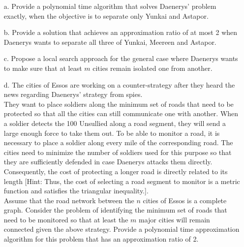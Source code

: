\documentclass{article}
\begin{document}
\begin{itemize}
\item[a.] Provide a polynomial time algorithm that solves Daenerys'
  problem exactly, when the objective is to separate only Yunkai and
  Astapor.

\item[b.] Provide a solution that achieves an approximation ratio of
  at most 2 when Daenerys wants to separate all three of Yunkai,
  Meereen and Astapor.
  
\item[c.] Propose a local search approach for the general case where
  Daenerys wants to make sure that at least $m$ cities remain isolated
  one from another.

\item[d.] The cities of Essos are working on a counter-strategy after
  they heard the news regarding Daenerys' strategy from spies.\\

 \noindent They want to place soldiers along the minimum set of roads
 that need to be protected so that all the cities can still
 communicate one with another. When a soldier detects the 100
 Unsullied along a road segment, they will send a large enough force
 to take them out. To be able to monitor a road, it is necessary to
 place a soldier along every mile of the corresponding road. The
 cities need to minimize the number of soldiers used for this purpose
 so that they are sufficiently defended in case Daenerys attacks them
 directly. Consequently, the cost of protecting a longer road is
 directly related to its length [Hint: Thus, the cost of selecting a
   road segment to monitor is a metric function and satisfies the
   triangular inequality.].\\

 \noindent Assume that the road network between the $n$ cities of
 Essos is a complete graph. Consider the problem of identifying the
 minimum set of roads that need to be monitored so that at least the
 $m$ major cities will remain connected given the above strategy.
 Provide a polynomial time approximation algorithm for this problem
 that has an approximation ratio of 2.

\end{itemize}
\end{document}
